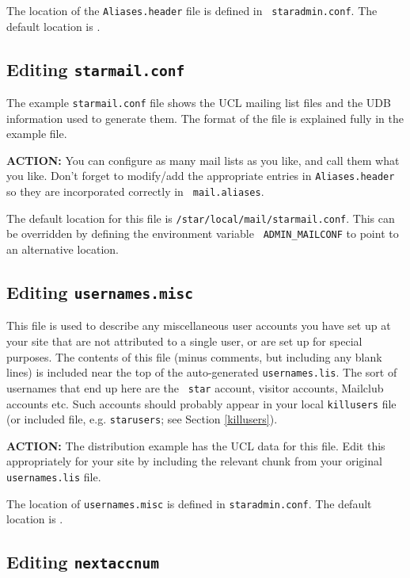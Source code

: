 The location of the {\tt Aliases.header} file is defined in {\tt
staradmin.conf}. The default location is . 

\subsection{Editing {\tt starmail.conf}}
\label{starmailconf}

The example {\tt starmail.conf} file shows the UCL mailing list files and
the UDB information used to generate them. The format of the file is
explained fully in the example file. 

{\large\bf ACTION:} You can configure as many mail lists as you like, and
call them what you like. Don't forget to modify/add the appropriate
entries in {\tt Aliases.header} so they are incorporated correctly in {\tt
mail.aliases}. 

The default location for this file is {\tt /star/local/mail/starmail.conf}. 
This can be overridden by defining the environment variable {\tt 
ADMIN\_MAILCONF} to point to an alternative location. 

\subsection{Editing {\tt usernames.misc}}
\label{usernames.misc}

This file is used to describe any miscellaneous user accounts you have set
up at your site that are not attributed to a single user, or are set up
for special purposes. The contents of this file (minus comments, but
including any blank lines) is included near the top of the auto-generated
{\tt usernames.lis}. The sort of usernames that end up here are the {\tt
star} account, visitor accounts, Mailclub accounts etc. Such accounts
should probably appear in your local {\tt killusers} file (or included
file, e.g. {\tt starusers}; see Section \ref{killusers}). 

{\large\bf ACTION:} The distribution example has the UCL data for this
file. Edit this appropriately for your site by including the relevant
chunk from your original {\tt usernames.lis} file. 

The location of {\tt usernames.misc} is defined in {\tt staradmin.conf}.
The default location is . 

\subsection{Editing {\tt nextaccnum}}

